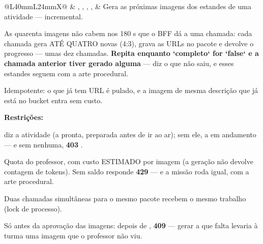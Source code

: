 \begin{tabularx}{\linewidth}{@{}L{40mm}L{24mm}X@{}}
\zebra {} & , , , ,  & Gera as próximas imagens dos estandes de uma atividade --- incremental.\par As quarenta imagens não cabem nos 180 s que o BFF dá a uma chamada: cada chamada gera ATÉ QUATRO novas (4:3), grava as URLs no pacote e devolve o progresso --- umas dez chamadas. \textbf{Repita enquanto `completo` for `false` e a chamada anterior tiver gerado alguma} ---  diz o que não saiu, e esses estandes seguem com a arte procedural.\par Idempotente: o que já tem URL é pulado, e a imagem de mesma descrição que já está no bucket entra sem custo.\par \textbf{Restrições:}\par \hspace*{1em}\textbullet{}  diz a atividade (a pronta, preparada antes de ir ao ar); sem ele, a em andamento --- e sem nenhuma, \textbf{403} .\par \hspace*{1em}\textbullet{} Quota do professor, com custo ESTIMADO por imagem (a geração não devolve contagem de tokens). Sem saldo responde \textbf{429}  --- e a missão roda igual, com a arte procedural.\par \hspace*{1em}\textbullet{} Duas chamadas simultâneas para o mesmo pacote recebem o mesmo trabalho (lock de processo).\par \hspace*{1em}\textbullet{} Só antes da aprovação das imagens: depois de , \textbf{409}  --- gerar a que falta levaria à turma uma imagem que o professor não viu.\\

\end{tabularx}
